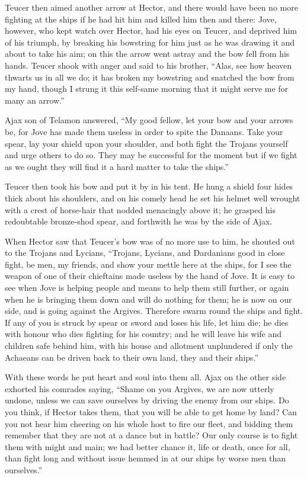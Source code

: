 Teucer then aimed another arrow at Hector, and there would have been no
more fighting at the ships if he had hit him and killed him then and
there: Jove, however, who kept watch over Hector, had his eyes on Teucer,
and deprived him of his triumph, by breaking his bowstring for him just as
he was drawing it and about to take his aim; on this the arrow went astray
and the bow fell from his hands. Teucer shook with anger and said to his
brother, “Alas, see how heaven thwarts us in all we do; it has broken my
bowstring and snatched the bow from my hand, though I strung it this
self-same morning that it might serve me for many an arrow.”

Ajax son of Telamon answered, “My good fellow, let your bow and your
arrows be, for Jove has made them useless in order to spite the Danaans.
Take your spear, lay your shield upon your shoulder, and both fight the
Trojans yourself and urge others to do so. They may be successful for the
moment but if we fight as we ought they will find it a hard matter to take
the ships.”

Teucer then took his bow and put it by in his tent. He hung a shield four
hides thick about his shoulders, and on his comely head he set his helmet
well wrought with a crest of horse-hair that nodded menacingly above it;
he grasped his redoubtable bronze-shod spear, and forthwith he was by the
side of Ajax.

When Hector saw that Teucer’s bow was of no more use to him, he shouted
out to the Trojans and Lycians, “Trojans, Lycians, and Dardanians good in
close fight, be men, my friends, and show your mettle here at the ships,
for I see the weapon of one of their chieftains made useless by the hand
of Jove. It is easy to see when Jove is helping people and means to help
them still further, or again when he is bringing them down and will do
nothing for them; he is now on our side, and is going against the Argives.
Therefore swarm round the ships and fight. If any of you is struck by
spear or sword and loses his life, let him die; he dies with honour who
dies fighting for his country; and he will leave his wife and children
safe behind him, with his house and allotment unplundered if only the
Achaeans can be driven back to their own land, they and their ships.”

With these words he put heart and soul into them all. Ajax on the other
side exhorted his comrades saying, “Shame on you Argives, we are now
utterly undone, unless we can save ourselves by driving the enemy from our
ships. Do you think, if Hector takes them, that you will be able to get
home by land? Can you not hear him cheering on his whole host to fire our
fleet, and bidding them remember that they are not at a dance but in
battle? Our only course is to fight them with might and main; we had
better chance it, life or death, once for all, than fight long and without
issue hemmed in at our ships by worse men than ourselves.”

